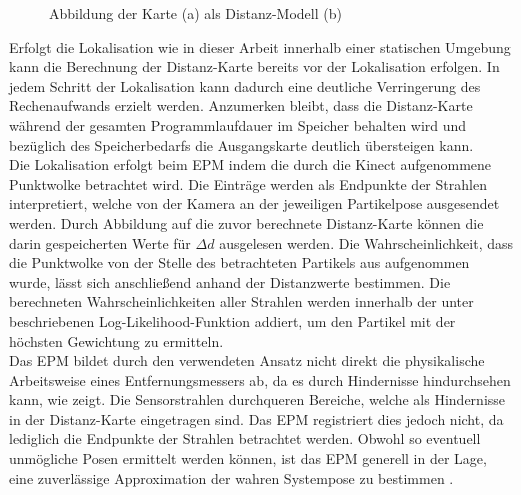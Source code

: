 \begin{figure}[!ht]
	\begin{center}
	
	\hspace{5mm}
	\caption{Abbildung der Karte (a) als Distanz-Modell (b)}
	\label{fig.dist_map}
	\end{center}
\end{figure}

Erfolgt die Lokalisation wie in dieser Arbeit innerhalb einer statischen Umgebung kann die Berechnung der Distanz-Karte bereits vor der Lokalisation erfolgen. In jedem Schritt der Lokalisation kann dadurch eine deutliche Verringerung des Rechenaufwands erzielt werden. Anzumerken bleibt, dass die Distanz-Karte während der gesamten Programmlaufdauer im Speicher behalten wird und bezüglich des Speicherbedarfs die Ausgangskarte deutlich übersteigen kann.\\

Die Lokalisation erfolgt beim EPM indem die durch die Kinect aufgenommene Punktwolke betrachtet wird. Die Einträge werden als Endpunkte der Strahlen interpretiert, welche von der Kamera an der jeweiligen Partikelpose ausgesendet werden. Durch Abbildung auf die zuvor berechnete Distanz-Karte können die darin gespeicherten Werte für $\Delta d$ ausgelesen werden. Die Wahrscheinlichkeit, dass die Punktwolke von der Stelle des betrachteten Partikels aus aufgenommen wurde, lässt sich anschließend anhand der Distanzwerte bestimmen. Die berechneten Wahrscheinlichkeiten aller Strahlen werden innerhalb der unter  beschriebenen Log-Likelihood-Funktion addiert, um den Partikel mit der höchsten Gewichtung zu ermitteln.\\

Das EPM bildet durch den verwendeten Ansatz nicht direkt die physikalische Arbeitsweise eines Entfernungsmessers ab, da es durch Hindernisse \glqq hindurchsehen\grqq{} kann, wie  zeigt. Die Sensorstrahlen durchqueren Bereiche, welche als Hindernisse in der Distanz-Karte eingetragen sind. Das EPM registriert dies jedoch nicht, da lediglich die Endpunkte der Strahlen betrachtet werden. Obwohl so eventuell unmögliche Posen ermittelt werden können, ist das EPM generell in der Lage, eine zuverlässige Approximation der wahren Systempose zu bestimmen \cite{Konolige1999}.\\


